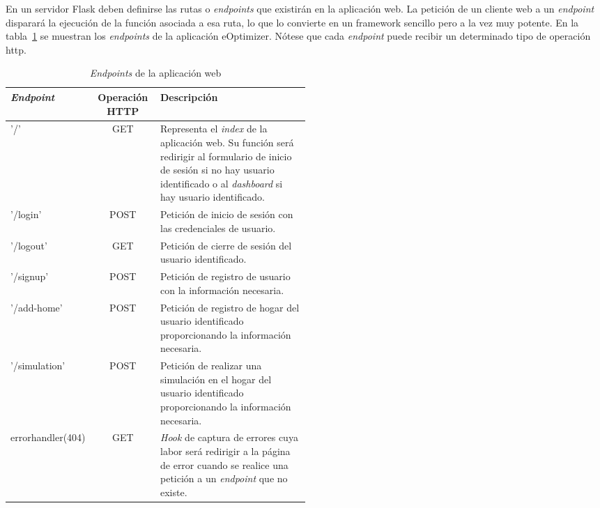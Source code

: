 En un servidor Flask deben definirse las rutas o \textit{endpoints} que existirán en la aplicación web. La petición de un cliente web a un \textit{endpoint} disparará la ejecución de la función asociada a esa ruta, lo que lo convierte en un framework sencillo pero a la vez muy potente. En la tabla~\ref{tab:endpoints} se muestran los \textit{endpoints} de la aplicación eOptimizer. Nótese que cada \textit{endpoint} puede recibir un determinado tipo de operación http.
\begin{table}[hp]
        \centering
        \begin{tabular}{|l|c|p{0.5\linewidth}|}
                \hline
                \textbf{\textit{Endpoint}} & \textbf{Operación HTTP} & \textbf{Descripción}\\ \hline
                '/' & GET & Representa el \textit{index} de la aplicación web. Su función será redirigir al formulario de inicio de sesión si no hay usuario identificado o al \textit{dashboard} si hay usuario identificado.\\ \hline
                '/login' & POST & Petición de inicio de sesión con las credenciales de usuario. \\ \hline
                '/logout' & GET & Petición de cierre de sesión del usuario identificado. \\ \hline
                '/signup' & POST & Petición de registro de usuario con la información necesaria. \\ \hline
                '/add-home' & POST & Petición de registro de hogar del usuario identificado proporcionando la información necesaria. \\ \hline
                '/simulation' & POST & Petición de realizar una simulación en el hogar del usuario identificado proporcionando la información necesaria. \\ \hline
                errorhandler(404) & GET & \textit{Hook} de captura de errores cuya labor será redirigir a la página de error cuando se realice una petición a un \textit{endpoint} que no existe. \\ \hline
             \end{tabular}
        \caption{\textit{Endpoints} de la aplicación web}
        \label{tab:endpoints}
\end{table}

